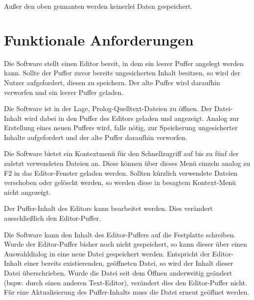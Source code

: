 \documentclass[parskip=full,11pt,twoside]{scrartcl}
\begin{document}
Außer den oben gennanten werden keinerlei Daten gespeichert.
\section{Funktionale Anforderungen}


Die Software stellt einen Editor bereit, in dem ein leerer Puffer angelegt werden kann. Sollte der Puffer zuvor bereits ungesicherten Inhalt besitzen, so wird der Nutzer aufgefordert, diesen zu speichern. Der alte Puffer wird daraufhin verworfen und ein leerer Puffer geladen.


Die Software ist in der Lage, Prolog-Quelltext-Dateien zu öffnen. Der Datei-Inhalt wird dabei in den Puffer des Editors geladen und angezeigt. Analog zur Erstellung eines neuen Puffers wird, falls nötig, zur Speicherung ungesicherter Inhalte aufgefordert und der alte Puffer daraufhin verworfen.


Die Software bietet ein Kontextmenü für den Schnellzugriff auf bis zu fünf der zuletzt verwendeten Dateien an. Diese können über dieses Menü einzeln analog zu F2 in das Editor-Fenster geladen werden. Sollten kürzlich verwendete Dateien verschoben oder gelöscht werden, so werden diese in besagtem Kontext-Menü nicht angezeigt.


Der Puffer-Inhalt des Editors kann bearbeitet werden. Dies verändert ausschließlich den Editor-Puffer.


Die Software kann den Inhalt des Editor-Puffers auf die Festplatte schreiben. Wurde der Editor-Puffer bisher noch nicht gespeichert, so kann dieser über einen Auswahldialog in eine neue Datei gespeichert werden. Entspricht der Editor-Inhalt einer bereits existierenden, geöffneten Datei, so wird der Inhalt dieser Datei überschrieben. Wurde die Datei seit dem Öffnen anderweitig geändert (bspw. durch einen anderen Text-Editor), verändert dies den Editor-Puffer nicht. Für eine Aktualisierung des Puffer-Inhalts muss die Datei erneut geöffnet werden.
\end{document}
